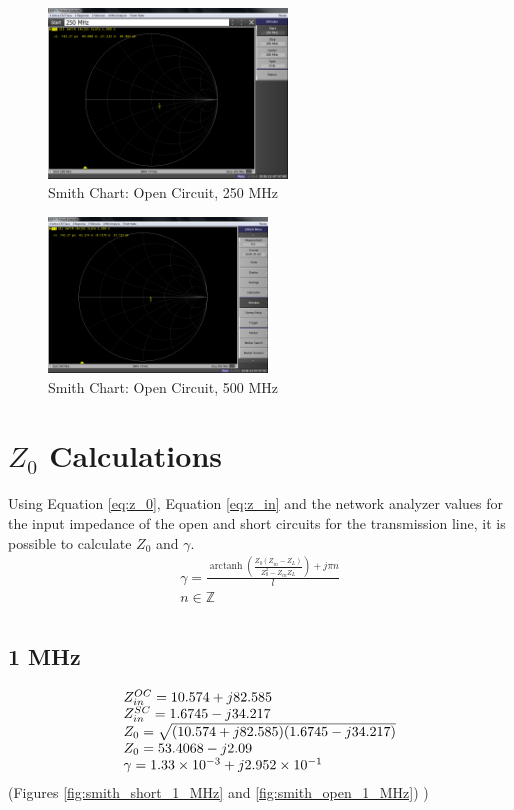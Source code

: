 \documentclass[conference]{IEEEtran}
\DeclareMathOperator\arctanh{arctanh}
\begin{document}
\begin{figure}[H]
  \centering
  \includegraphics[width=2.5in]{./img/smith_open_250_MHz.png}
  \caption{Smith Chart: Open Circuit, 250 MHz}
  \label{fig:smith_open_250_MHz}
\end{figure}

\begin{figure}[H]
  \centering
  \includegraphics[width=2.29in]{./img/smith_open_500_MHz.png}
  \caption{Smith Chart: Open Circuit, 500 MHz}
  \label{fig:smith_open_500_MHz}
\end{figure}

\section{$Z_0$ Calculations}
Using Equation \ref{eq:z_0}, Equation \ref{eq:z_in} and the network analyzer values for the input
impedance of the open and short circuits for the transmission line, it is
possible to calculate $Z_0$ and $\gamma$.
\[
  \begin{array}{ll}
    \gamma = \frac{\arctanh{(\frac{Z_0 (Z_{in}-Z_L)}{Z_0^2-Z_{in} Z_L})} +
      j\pi n}{l}\\
    n \in \mathbb{Z}\\
  \end{array}
  \]

\subsection{1 MHz}
\begin{equation}{\label{eq:z_0_1_MHz}}
  \begin{array}{ll}
    Z_{in}^{OC} = 10.574 + j82.585\\
    Z_{in}^{SC} = 1.6745 - j34.217\\
    Z_0 = \sqrt{(10.574 + j82.585)(1.6745 - j34.217)}\\
    Z_0 = 53.4068 - j2.09\\
    \gamma = \num{1.33e-3} + j\num{2.952e-1}
  \end{array}
\end{equation}
(Figures \ref{fig:smith_short_1_MHz} and \ref{fig:smith_open_1_MHz})
)
\end{document}
